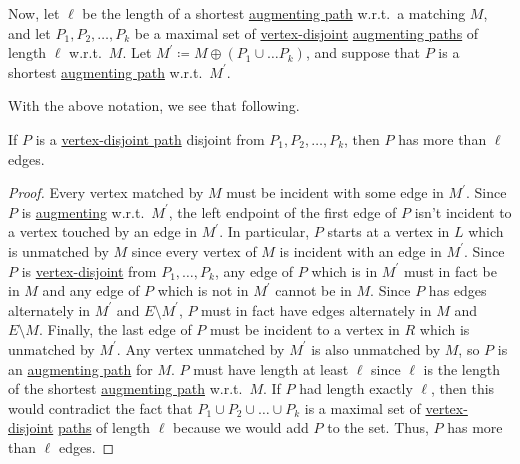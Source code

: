 Now, let \(\ell \) be the length of a shortest \hyperref[def:augmenting-path]{augmenting path} w.r.t.\ a matching \(M\), and let \(P_1, P_2, \ldots  , P_k\) be a maximal set of \hyperref[def:vertex-independent]{vertex-disjoint} \hyperref[def:augmenting-path]{augmenting paths} of length \(\ell \) w.r.t.\ \(M\). Let \(M^\prime \coloneqq M\oplus (P_1 \cup \ldots P_k )\), and suppose that \(P\) is a shortest \hyperref[def:augmenting-path]{augmenting path} w.r.t.\ \(M^\prime \).

With the above notation, we see that following.

\begin{lemma}\label{lma:lec25-3}
	If \(P\) is a \hyperref[def:vertex-independent]{vertex-disjoint path} disjoint from \(P_1, P_2, \ldots , P_k \), then \(P\) has more than \(\ell \) edges.
\end{lemma}
\begin{proof}
	Every vertex matched by \(M\) must be incident with some edge in \(M^\prime \). Since \(P\) is \hyperref[def:augmenting-path]{augmenting} w.r.t.\ \(M^\prime \), the left endpoint of the first edge of \(P\) isn't incident to a vertex touched by an edge in \(M^\prime \). In particular, \(P\) starts at a vertex in \(L\) which is unmatched by \(M\) since every vertex of \(M\) is incident with an edge in \(M^\prime \). Since \(P\) is \hyperref[def:vertex-independent]{vertex-disjoint} from \(P_1, \ldots  , P_k\), any edge of \(P\) which is in \(M^\prime \) must in fact be in \(M\) and any edge of \(P\) which is not in \(M^\prime \) cannot be in \(M\). Since \(P\) has edges alternately in \(M^\prime \) and \(E \setminus M^\prime \), \(P\) must in fact have edges alternately in \(M\) and \(E \setminus M\). Finally, the last edge of \(P\) must be incident to a vertex in \(R\) which is unmatched by \(M^\prime \). Any vertex unmatched by \(M^\prime \) is also unmatched by \(M\), so \(P\) is an \hyperref[def:augmenting-path]{augmenting path} for \(M\). \(P\) must have length at least \(\ell \) since \(\ell \) is the length of the shortest \hyperref[def:augmenting-path]{augmenting path} w.r.t.\ \(M\). If \(P\) had length exactly \(\ell \), then this would contradict the fact that \(P_1 \cup P_2 \cup \ldots  \cup P_k\) is a maximal set of \hyperref[def:vertex-independent]{vertex-disjoint} \hyperref[def:path]{paths} of length \(\ell \) because we would add \(P\) to the set. Thus, \(P\) has more than \(\ell \) edges.
\end{proof}

